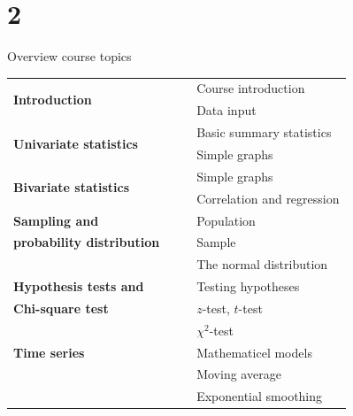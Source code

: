 \documentclass{beamer}
\newcommand{\tabitem}{~~\llap{\textbullet}~~}
\begin{document}
\section{2}

\begin{frame}{Overview course topics}

\begin{table}[h]
\begin{tabular}{l|l}
  \multirow{2}{*}{\textbf{Introduction}} &
     \tabitem Course introduction \\
   & \tabitem Data input \\

  \hline
  \multirow{2}{*}{\textbf{Univariate statistics}} &
      \tabitem Basic summary statistics \\
    & \tabitem Simple graphs\\

  \hline
  \multirow{2}{*}{\textbf{Bivariate statistics}} &
      \tabitem Simple graphs \\
    & \tabitem Correlation and regression\\

  \hline
  \textbf{Sampling and} & \tabitem Population\\
  \textbf{probability distribution}  & \tabitem Sample\\
    & \tabitem The normal distribution\\

  \hline
  \textbf{Hypothesis tests and} & \tabitem Testing hypotheses \\
  \textbf{Chi-square test}     & \tabitem $z$-test, $t$-test\\
                                 & \tabitem $\chi^{2}$-test\\
  \hline
  \textbf{Time series} & \tabitem Mathematicel models \\
                       & \tabitem Moving average \\
                       & \tabitem Exponential smoothing \\
\end{tabular}
\end{table}
\end{frame}
\end{document}
